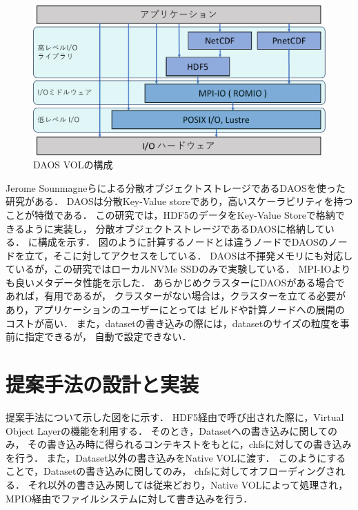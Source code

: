 \documentclass[submit,techrep,noauthor]{ipsj}
\begin{document}
\begin{figure}[tbp]
	\centering
	\includegraphics[page=6,width=\linewidth]{figure-crop.pdf}
	\caption{DAOS VOLの構成}
	\label{fig:voldaos}
\end{figure}

Jerome Sounmagneらによる分散オブジェクトストレージであるDAOSを使った研究がある\cite{soumagne2021accelerating}．
DAOSは分散Key-Value storeであり，高いスケーラビリティを持つことが特徴である．
この研究では，HDF5のデータをKey-Value Storeで格納できるように実装し，
分散オブジェクトストレージであるDAOSに格納している．
に構成を示す．
図のように計算するノードとは違うノードでDAOSのノードを立て，そこに対してアクセスをしている．
DAOSは不揮発メモリにも対応しているが，この研究ではローカルNVMe SSDのみで実験している．
MPI-IOよりも良いメタデータ性能を示した．
あらかじめクラスターにDAOSがある場合であれば，有用であるが，
クラスターがない場合は，クラスターを立てる必要があり，アプリケーションのユーザーにとっては
ビルドや計算ノードへの展開のコストが高い．
また，datasetの書き込みの際には，datasetのサイズの粒度を事前に指定できるが，
自動で設定できない．

\section{提案手法の設計と実装}
提案手法について示した図をに示す．
HDF5経由で呼び出された際に，Virtual Object Layerの機能を利用する．
そのとき，Datasetへの書き込みに関してのみ，
その書き込み時に得られるコンテキストをもとに，chfsに対しての書き込みを行う．
また，Dataset以外の書き込みをNative VOLに渡す．
このようにすることで，Datasetの書き込みに関してのみ，
chfsに対してオフローディングされる．
それ以外の書き込み関しては従来どおり，Native VOLによって処理され，
MPIO経由でファイルシステムに対して書き込みを行う．
\end{document}
